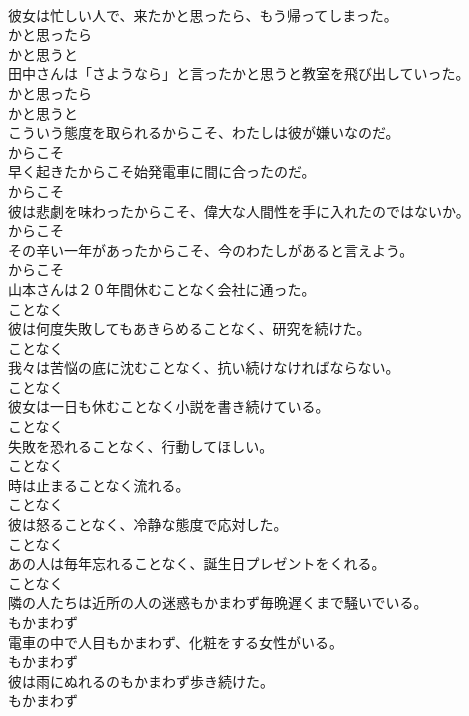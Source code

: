 \documentclass[8pt]{extreport}
\begin{document}
\begin{CJK}{UTF8}{min}
\\	彼女は忙しい人で、来たかと思ったら、もう帰ってしまった。	
\\	かと思ったら 
\\	かと思うと	
\\	田中さんは「さようなら」と言ったかと思うと教室を飛び出していった。	
\\	かと思ったら 
\\	かと思うと	
\\	こういう態度を取られるからこそ、わたしは彼が嫌いなのだ。	
\\	からこそ	
\\	早く起きたからこそ始発電車に間に合ったのだ。	
\\	からこそ	
\\	彼は悲劇を味わったからこそ、偉大な人間性を手に入れたのではないか。	
\\	からこそ	
\\	その辛い一年があったからこそ、今のわたしがあると言えよう。	
\\	からこそ	
\\	山本さんは２０年間休むことなく会社に通った。	
\\	ことなく	
\\	彼は何度失敗してもあきらめることなく、研究を続けた。	
\\	ことなく	
\\	我々は苦悩の底に沈むことなく、抗い続けなければならない。	
\\	ことなく	
\\	彼女は一日も休むことなく小説を書き続けている。	
\\	ことなく	
\\	失敗を恐れることなく、行動してほしい。	
\\	ことなく	
\\	時は止まることなく流れる。	
\\	ことなく	
\\	彼は怒ることなく、冷静な態度で応対した。	
\\	ことなく	
\\	あの人は毎年忘れることなく、誕生日プレゼントをくれる。	
\\	ことなく	
\\	隣の人たちは近所の人の迷惑もかまわず毎晩遅くまで騒いでいる。	
\\	もかまわず	
\\	電車の中で人目もかまわず、化粧をする女性がいる。	
\\	もかまわず	
\\	彼は雨にぬれるのもかまわず歩き続けた。	
\\	もかまわず	

\end{CJK}
\end{document}
